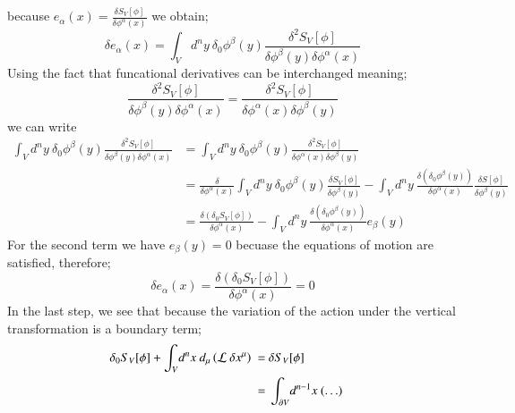 \documentclass{article}
\begin{document}
because $e_\alpha(x) = \frac{\delta S_V\left[\phi\right]}{\delta \phi^\alpha(x)}$ we obtain;
\[
	\delta e_\alpha(x) = \int_V\! d^ny~ \delta_0\phi^{\beta}(y)\frac{\delta^2 S_V[\phi]}{\delta \phi^{\beta}(y)\delta \phi^{\alpha}(x)}
\]
Using the fact that funcational derivatives can be interchanged meaning;
\[
	\frac{\delta^2 S_V[\phi]}{\delta \phi^{\beta}(y)\delta \phi^{\alpha}(x)} = \frac{\delta^2 S_V[\phi]}{\delta \phi^{\alpha}(x)\delta \phi^{\beta}(y)}
\]
we can write
\begin{align*}
	\int_V\! d^ny~ \delta_0\phi^{\beta}(y)\frac{\delta^2 S_V[\phi]}{\delta \phi^{\beta}(y)\delta \phi^{\alpha}(x)} &= \int_V\! d^ny~ \delta_0\phi^{\beta}(y)\frac{\delta^2 S_V[\phi]}{\delta \phi^{\alpha}(x)\delta \phi^{\beta}(y)} \\
														        &= \frac{\delta}{\delta \phi^{\alpha}(x)} \int_V\! d^ny~ \delta_0\phi^{\beta}(y)\frac{\delta S_V[\phi]}{\delta \phi^{\beta}(y)} -\int_V\! d^ny~ \frac{\delta(\delta_0\phi^{\beta}(y))}{\delta \phi^{\alpha}(x)} \frac{\delta S[\phi]}{\delta \phi^{\beta}(y)} \\
	&= \frac{\delta(\delta_0 S_V[\phi]) }{\delta \phi^{\alpha}(x)} -\int_V\! d^ny~ \frac{\delta(\delta_0\phi^{\beta}(y))}{\delta \phi^{\alpha}(x)} e_{\beta}(y)
\end{align*}
For the second term we have $e_\beta(y) = 0$ becuase the equations of motion are satisfied, therefore;
\[
	\delta e_\alpha(x) = \frac{\delta(\delta_0 S_V[\phi]) }{\delta \phi^{\alpha}(x)} = 0
\]
In the last step, we see that because the variation of the action under the vertical transformation is a boundary term;
\begin{align*}  \delta_0 S_V[\phi]+\int_V\! d^nx~d_{\mu} \left({\cal L}~\delta x^{\mu} \right)  ~=~&\delta S_V[\phi]\cr
~=~&\int_{\partial V} \!d^{n-1}x~(\ldots)\end{align*}
\end{document}
